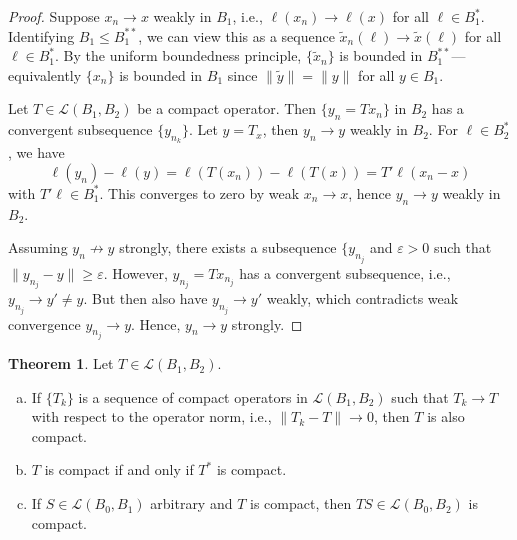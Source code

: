 \documentclass[12pt]{article}
\theoremstyle{definition}
\newtheorem{theorem}{Theorem}
\newcommand{\LL}{\mathcal{L}}
\newcommand{\eps}{\varepsilon}
\newcommand{\<}{\left\langle}
\renewcommand{\>}{\right\rangle}
\begin{document}
\begin{proof}
    Suppose $x_n \to x$ weakly in $B_1$, i.e., $\ell(x_n) \to \ell(x)$ for all $\ell \in B_1^*$.
    Identifying $B_1 \leq B_1^{**}$, we can view this as a sequence $\tilde{x}_n(\ell) \to \tilde{x}(\ell)$ for all $\ell \in B_1^*$.
    By the uniform boundedness principle, $\{\tilde{x}_n\}$ is bounded in $B_1^{**}$---equivalently $\{x_n\}$ is bounded in $B_1$ since $\|\tilde{y}\| = \|y\|$ for all $y \in B_1$.

    Let $T \in \LL(B_1, B_2)$ be a compact operator.
    Then $\{y_n = Tx_n\}$ in $B_2$ has a convergent subsequence $\{y_{n_k}\}$.
    Let $y = T_x$, then $y_n \to y$ weakly in $B_2$.
    For $\ell \in B_2^*$, we have
    \[
        \ell(y_n) - \ell(y)
            = \ell(T(x_n)) - \ell(T(x))
            = T'\ell(x_n - x)
    \]
    with $T'\ell \in B_1^*$.
    This converges to zero by weak $x_n \to x$, hence $y_n \to y$ weakly in $B_2$.

    Assuming $y_n \not\to y$ strongly, there exists a subsequence $\{y_{n_j}$ and $\eps > 0$ such that $\|y_{n_j} - y\| \geq \eps$.
    However, $y_{n_j} = Tx_{n_j}$ has a convergent subsequence, i.e., $y_{n_j} \to y' \ne y$.
    But then also have $y_{n_j} \to y'$ weakly, which contradicts weak convergence $y_{n_j} \to y$.
    Hence, $y_n \to y$ strongly.
\end{proof}

\begin{theorem}
    Let $T \in \LL(B_1, B_2)$.
    \begin{enumerate}[(a)]
        \item If $\{T_k\}$ is a sequence of compact operators in $\LL(B_1, B_2)$ such that $T_k \to T$ with respect to the operator norm, i.e., $\|T_k - T\| \to 0$, then $T$ is also compact.
        \item $T$ is compact if and only if $T^*$ is compact.
        \item If $S \in \LL(B_0, B_1)$ arbitrary and $T$ is compact, then $TS \in \LL(B_0, B_2)$ is compact.
    \end{enumerate}
\end{theorem}
\end{document}
